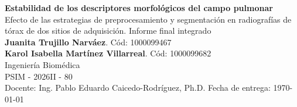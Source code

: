 \documentclass[11pt,a4paper]{article}
\newcommand{\tituloTrabajo}{Estabilidad de los descriptores morfológicos del campo pulmonar}
\newcommand{\subtituloTrabajo}{Efecto de las estrategias de preprocesamiento y segmentación en radiografías de tórax de dos sitios de adquisición. Informe final integrado}
\begin{document}
\thispagestyle{empty}
\begin{titlepage}
    \centering
    {\LARGE \textbf{\tituloTrabajo}}\\[0.6cm]
    {\large \subtituloTrabajo}\\[2cm]
    {\large \textbf{Juanita Trujillo Narváez}. Cód: 1000099467}\\
    {\large \textbf{Karol Isabella Martínez Villarreal}. Cód: 1000099682}\\[1cm]
    {\large Ingeniería Biomédica}\\[0.4cm]
    {\large PSIM - 2026II - 80}\\
    Docente: Ing. Pablo Eduardo Caicedo-Rodríguez, Ph.D.
    \vfill
    Fecha de entrega: \today
\end{titlepage}

\tableofcontents
\newpage










\appendix


\end{document}
